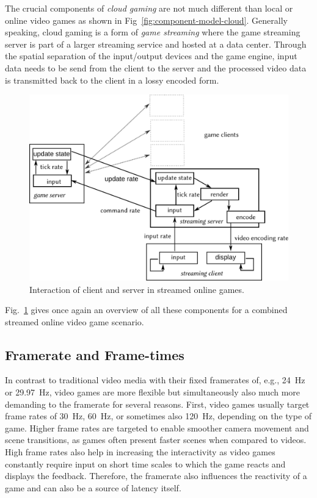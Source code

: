 The crucial components of \textit{cloud gaming} are not much different than local or online video games as shown in Fig~\ref{fig:component-model-cloud}. Generally speaking, cloud gaming is a form of \textit{game streaming} where the game streaming server is part of a larger streaming service and hosted at a data center. Through the spatial separation of the input/output devices and the game engine, input data needs to be send from the client to the server and the processed video data is transmitted back to the client in a lossy encoded form.

\begin{figure}[!t]
	\centering
	\includegraphics[width=1.0\columnwidth]{../models/game-tick-rate-streamed.pdf}
	\caption{Interaction of client and server in streamed online games.}
\label{fig:tickrate-streamed}
\end{figure}

Fig.~\ref{fig:tickrate-streamed} gives once again an overview of all these components for a combined streamed online video game scenario.


\subsection{Framerate and Frame-times}
\label{sec:framerate}

In contrast to traditional video media with their fixed framerates of, e.g., \SI{24}{\hertz} or \SI{29.97}{\hertz}, video games are more flexible but simultaneously also much more demanding to the framerate for several reasons. First, video games usually target frame rates of \SI{30}{\hertz}, \SI{60}{\hertz}, or sometimes also \SI{120}{\hertz}, depending on the type of game. Higher frame rates are targeted to enable smoother camera movement and scene transitions, as games often present faster scenes when compared to videos. High frame rates also help in increasing the interactivity as video games constantly require input on short time scales to which the game reacts and displays the feedback. Therefore, the framerate also influences the reactivity of a game and can also be a source of latency itself.

